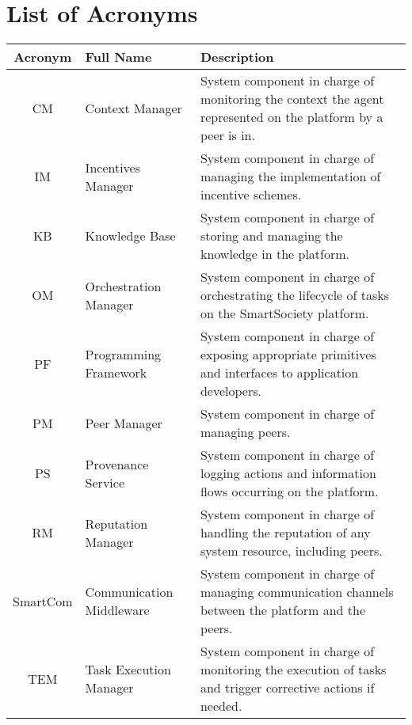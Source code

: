 \documentclass{SmartReport}
\begin{document}
\section*{List of Acronyms}
\begin{tabular}{|c|p{3cm}|p{10cm}|}
\hline 
\textbf{Acronym} & \textbf{Full Name} & \textbf{Description} \\
\hline 
\hline 
CM & Context Manager & System component in charge of monitoring the
context the agent represented on the platform by a peer is in.\\
\hline
IM & Incentives Manager & System component in charge of managing the implementation of incentive schemes.\\  
\hline 
KB & Knowledge Base &  System component in charge of storing and managing the knowledge in the platform.\\
\hline
OM & Orchestration Manager &  System component in charge of
orchestrating the lifecycle of tasks on the SmartSociety platform. \\
\hline 
PF & Programming Framework &  System component in charge of exposing
appropriate primitives and interfaces to application developers.\\
\hline 
PM & Peer Manager &  System component in charge of managing peers.\\
\hline 
PS & Provenance Service & System component in charge of logging actions and information flows occurring on the platform.\\
\hline
RM & Reputation Manager & System component in charge of handling the reputation of any system resource, including peers. \\
\hline
SmartCom & Communication Middleware & System component in charge of managing
communication channels between the platform and the peers. \\
\hline
TEM & Task Execution Manager & System component in charge of
monitoring the execution of tasks and trigger corrective actions if
needed.\\
\hline
\end{tabular}

\newpage

\end{document}
